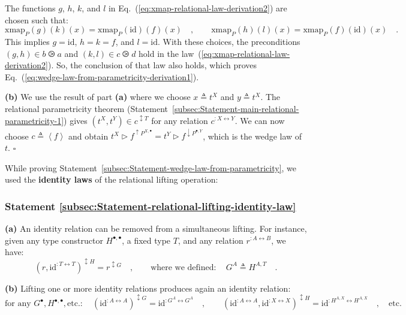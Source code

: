 The functions $g$, $h$, $k$, and $l$ in Eq.~(\ref{eq:xmap-relational-law-derivation2})
are chosen such that:
\[
\text{xmap}_{P}(g)(k)(x)=\text{xmap}_{P}(\text{id})(f)(x)\quad,\quad\quad\text{xmap}_{P}(h)(l)(x)=\text{xmap}_{P}(f)(\text{id})(x)\quad.
\]
This implies $g=\text{id}$, $h=k=f$, and $l=\text{id}$. With these
choices, the preconditions $(g,h)\in b\ogreaterthan a$ and $(k,l)\in c\ogreaterthan d$
hold in the law~(\ref{eq:xmap-relational-law-derivation2}). So,
the conclusion of that law also holds, which proves Eq.~(\ref{eq:wedge-law-from-parametricity-derivation1}). 

\textbf{(b)} We use the result of part \textbf{(a)} where we choose
$x\triangleq t^{X}$ and $y\triangleq t^{X}$. The relational parametricity
theorem (Statement~\ref{subsec:Statement-main-relational-parametricity-1})
gives $(t^{X},t^{Y})\in c^{\updownarrow T}$ for any relation $c^{:X\leftrightarrow Y}$.
We can now choose $c\triangleq\left<f\right>$ and obtain $t^{X}\triangleright f^{\uparrow P^{X,\bullet}}=t^{Y}\triangleright f^{\downarrow P^{\bullet,Y}}$,
which is the wedge law of $t$. $\square$

While proving Statement~\ref{subsec:Statement-wedge-law-from-parametricity},
we used the \textbf{identity laws}
of the relational lifting operation:

\subsubsection{Statement \label{subsec:Statement-relational-lifting-identity-law}\ref{subsec:Statement-relational-lifting-identity-law}}

\textbf{(a)} An identity relation can be removed from a simultaneous
lifting. For instance, given any type constructor $H^{\bullet,\bullet}$,
a fixed type $T$, and any relation $r^{:A\leftrightarrow B}$, we
have: 
\[
(r,\text{id}^{:T\leftrightarrow T})^{\updownarrow H}=r^{\updownarrow G}\quad,\quad\quad\text{where we defined}:\quad G^{A}\triangleq H^{A,T}\quad.
\]

\textbf{(b)} Lifting one or more identity relations produces again
an identity relation: 
\[
\text{for any }G^{\bullet},H^{\bullet,\bullet},\text{etc}.:\quad(\text{id}^{:A\leftrightarrow A})^{\updownarrow G}=\text{id}^{:G^{A}\leftrightarrow G^{A}}\quad,\quad\quad(\text{id}^{:A\leftrightarrow A},\text{id}^{:X\leftrightarrow X})^{\updownarrow H}=\text{id}^{:H^{A,X}\leftrightarrow H^{A,X}}\quad,\quad\text{etc}.
\]


